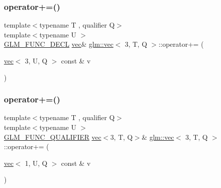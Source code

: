 \subsubsection{\texorpdfstring{operator+=()}{operator+=()}\hspace{0.1cm}{\footnotesize\ttfamily [4/6]}}
{\footnotesize\ttfamily template$<$typename T , qualifier Q$>$ \\
template$<$typename U $>$ \\
\mbox{\hyperlink{setup_8hpp_ab2d052de21a70539923e9bcbf6e83a51}{G\+L\+M\+\_\+\+F\+U\+N\+C\+\_\+\+D\+E\+CL}} \mbox{\hyperlink{structglm_1_1vec}{vec}}\& \mbox{\hyperlink{structglm_1_1vec}{glm\+::vec}}$<$ 3, T, Q $>$\+::operator+= (\begin{DoxyParamCaption}\item[{\mbox{\hyperlink{structglm_1_1vec}{vec}}$<$ 3, U, Q $>$ const \&}]{v }\end{DoxyParamCaption})}

\mbox{\label{structglm_1_1vec_3_013_00_01_t_00_01_q_01_4_aeed08e334ed3515bdb2050d15877bbe8}} 
\subsubsection{\texorpdfstring{operator+=()}{operator+=()}\hspace{0.1cm}{\footnotesize\ttfamily [5/6]}}
{\footnotesize\ttfamily template$<$typename T , qualifier Q$>$ \\
template$<$typename U $>$ \\
\mbox{\hyperlink{setup_8hpp_a33fdea6f91c5f834105f7415e2a64407}{G\+L\+M\+\_\+\+F\+U\+N\+C\+\_\+\+Q\+U\+A\+L\+I\+F\+I\+ER}} \mbox{\hyperlink{structglm_1_1vec}{vec}}$<$3, T, Q$>$\& \mbox{\hyperlink{structglm_1_1vec}{glm\+::vec}}$<$ 3, T, Q $>$\+::operator+= (\begin{DoxyParamCaption}\item[{\mbox{\hyperlink{structglm_1_1vec}{vec}}$<$ 1, U, Q $>$ const \&}]{v }\end{DoxyParamCaption})}

\mbox{\label{structglm_1_1vec_3_013_00_01_t_00_01_q_01_4_a6e025799ccd139ed94645bf141eed279}} 
